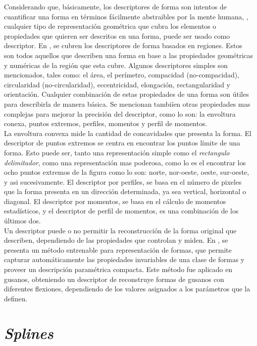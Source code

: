 Considerando que, b\'asicamente, los descriptores de forma son intentos de cuantificar
una forma en t\'erminos f\'acilmente abstraibles por la mente humana, \cite[p.1]{desclecture},
cualquier tipo de representaci\'on geom\'etrica que cubra los elementos o propiedades que
quieren ser descritos en una forma, puede ser usado como descriptor. En \cite{desclecture},
se cubren los descriptores de forma basados en regiones. Estos son todos aquellos que describen
una forma en base a las propiedades geom\'etricas y num\'ericas de la regi\'on que esta cubre.
Algunos descriptores simples son mencionados, tales como: el \'area, el per\'imetro,
compacidad (no-compacidad), circularidad (no-circularidad), eccentricidad, elongaci\'on,
rectangularidad y orientaci\'on. Cualquier combinaci\'on de estas propiedades de una forma
son \'utiles para describirla de manera b\'asica. Se mencionan tambi\'ien otras propiedades
mas complejas para mejorar la precisi\'on del descriptor, como lo son: la envoltura conexa, 
puntos extremos, perfiles, momentos y perfil de momentos.\\
La envoltura convexa mide la cantidad de concavidades que presenta la forma.
El descriptor de puntos extremos se centra en encontrar los puntos l\'imite de una forma. Esto puede ser, 
tanto una representaci\'on simple como el \emph{rectangulo delimitador}, como una
representaci\'on mas poderosa, como lo es el encontrar los ocho puntos extremos de la figura
como lo son: norte, nor-oeste, oeste, sur-oeste, y asi sucesivamente. El descriptor por
perfiles, se basa en el n\'umero de pixeles que la forma presenta en un direcci\'on determinada,
ya sea vertical, horizontal o diagonal. El descriptor por momentos, se basa en el c\'alculo
de momentos estad\'isticos, y el descriptor de perfil de momentos, es una combinaci\'on de
los \'ultimos dos.\\


Un descriptor puede o no permitir la reconstrucci\'on de la forma original que
describen, dependiendo de las propiedades que controlan y miden.
En \cite{wormparam}, se presenta un m\'etodo entrenable para representaci\'on
de formas, que permite capturar autom\'aticamente las propiedades invariables
de una clase de formas y proveer un descripci\'on param\'etrica compacta. Este
m\'etodo fue aplicado en gusanos, obteniendo un descriptor de reconstruye
formas de gusanos con diferentes flexiones, dependiendo de los valores
asignados a los par\'ametros que la definen.

\section{\emph{Splines}}
\label{sec:splines}

